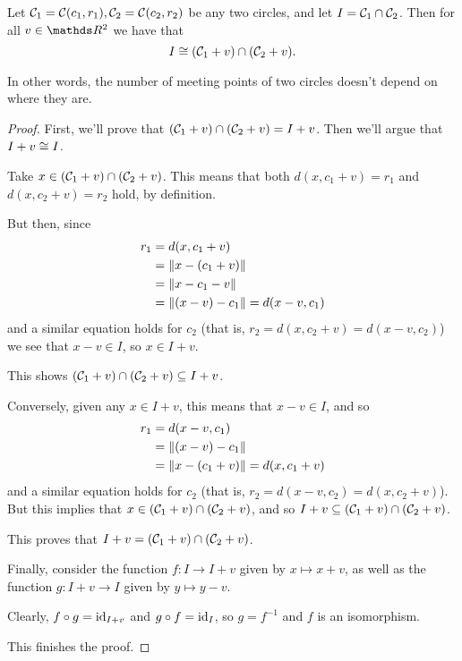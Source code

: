 \begin{lemma}
	Let $\mathcal C_1=\mathcal C(c_1,r_1),\mathcal C_2=\mathcal C(c_2,r_2)$ be any two circles, and let $I=\mathcal C_1\cap \mathcal C_2$. Then for all $v\in \R^2$ we have that 
	\[I\cong (\mathcal C_1+v)\cap (\mathcal C_2+v).\]
	
	In other words, the number of meeting points of two circles doesn't depend on where they are.
\end{lemma}
\begin{proof}
	First, we'll prove that $(\mathcal C_1+v)\cap (\mathcal C_2+v)=I+v$. Then we'll argue that $I+v\cong I$.
	
	Take $x\in (\mathcal C_1+v)\cap (\mathcal C_2+v)$. This means that both $d(x,c_1+v)=r_1$ and $d(x,c_2+v)=r_2$ hold, by definition.
	
	But then, since
	\begin{align*}
		r_1&=d(x,c_1+v)\\
		&=\lVert x-(c_1+v)\rVert\\
		&=\lVert x-c_1-v\rVert\\
		&=\lVert(x-v)-c_1\rVert=d(x-v,c_1)
	\end{align*} and a similar equation holds for $c_2$ (that is, $r_2=d(x,c_2+v)=d(x-v,c_2)$) we see that $x-v\in I$, so $x\in I+v$.
	
	This shows $(\mathcal C_1+v)\cap (\mathcal C_2+v)\subseteq I+v$.
	
	\bigskip
	Conversely, given any $x\in I+v$, this means that $x-v\in I$, and so 
	\begin{align*}
		r_1&=d(x-v,c_1)\\
		&=\lVert(x-v)-c_1\rVert\\
		&=\lVert x-(c_1+v)\rVert=d(x,c_1+v)
	\end{align*}
	and a similar equation holds for $c_2$ (that is, $r_2=d(x-v,c_2)=d(x,c_2+v)$). But this implies that $x\in (\mathcal C_1+v)\cap (\mathcal C_2+v)$, and so $I+v\subseteq (\mathcal C_1+v)\cap (\mathcal C_2+v)$.
	
	This proves that $I+v=(\mathcal C_1+v)\cap (\mathcal C_2+v)$.
	
	\bigskip
	Finally, consider the function $f:I\to I+v$ given by $x\mapsto x+v$, as well as the function $g:I+v\to I$ given by $y\mapsto y-v$.
	
	Clearly, $f\circ g={\rm id}_{I+v}$ and $g\circ f={\rm id}_I$, so $g=f^{-1}$ and $f$ is an isomorphism.
	
	This finishes the proof.
\end{proof}

